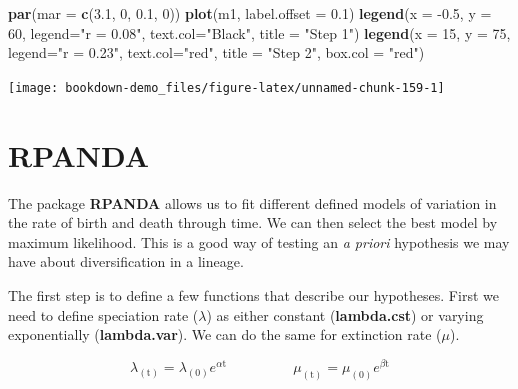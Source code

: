 \documentclass[
]{book}
\newenvironment{Shaded}{\begin{snugshade}}{\end{snugshade}}
\newcommand{\DataTypeTok}[1]{\textcolor[rgb]{0.13,0.29,0.53}{#1}}
\newcommand{\DecValTok}[1]{\textcolor[rgb]{0.00,0.00,0.81}{#1}}
\newcommand{\FloatTok}[1]{\textcolor[rgb]{0.00,0.00,0.81}{#1}}
\newcommand{\KeywordTok}[1]{\textcolor[rgb]{0.13,0.29,0.53}{\textbf{#1}}}
\newcommand{\NormalTok}[1]{#1}
\newcommand{\StringTok}[1]{\textcolor[rgb]{0.31,0.60,0.02}{#1}}
\begin{document}
\begin{Shaded}
\begin{Highlighting}[]
\KeywordTok{par}\NormalTok{(}\DataTypeTok{mar =} \KeywordTok{c}\NormalTok{(}\FloatTok{3.1}\NormalTok{, }\DecValTok{0}\NormalTok{, }\FloatTok{0.1}\NormalTok{, }\DecValTok{0}\NormalTok{))}
\KeywordTok{plot}\NormalTok{(m1, }\DataTypeTok{label.offset =} \FloatTok{0.1}\NormalTok{)}
\KeywordTok{legend}\NormalTok{(}\DataTypeTok{x =} \FloatTok{{-}0.5}\NormalTok{, }\DataTypeTok{y =} \DecValTok{60}\NormalTok{, }\DataTypeTok{legend=}\StringTok{"r = 0.08"}\NormalTok{,}
       \DataTypeTok{text.col=}\StringTok{"Black"}\NormalTok{, }\DataTypeTok{title =} \StringTok{"Step 1"}\NormalTok{)}
\KeywordTok{legend}\NormalTok{(}\DataTypeTok{x =} \DecValTok{15}\NormalTok{, }\DataTypeTok{y =} \DecValTok{75}\NormalTok{, }\DataTypeTok{legend=}\StringTok{"r = 0.23"}\NormalTok{,}
       \DataTypeTok{text.col=}\StringTok{"red"}\NormalTok{, }\DataTypeTok{title =} \StringTok{"Step 2"}\NormalTok{, }\DataTypeTok{box.col =} \StringTok{"red"}\NormalTok{)}
\end{Highlighting}
\end{Shaded}

\begin{center}\texttt{[image: bookdown-demo\_files/figure-latex/unnamed-chunk-159-1]} \end{center}

\hypertarget{rpanda}{%
\section{RPANDA}\label{rpanda}}

The package \textbf{RPANDA} \citep{rpanda} allows us to fit different defined models of variation in the rate of birth and death through time. We can then select the best model by maximum likelihood. This is a good way of testing an \emph{a priori} hypothesis we may have about diversification in a lineage.

The first step is to define a few functions that describe our hypotheses. First we need to define speciation rate (\(\lambda\)) as either constant (\textbf{lambda.cst}) or varying exponentially (\textbf{lambda.var}). We can do the same for extinction rate (\(\mu\)).

\[ \lambda_{(\text{t})} = \lambda_{(0)}e^{\alpha \text{t}} \;\;\;\;\;\;\;\;\;\;\;\;\;\;\;\;\;  \mu_{(\text{t})} = \mu_{(0)}e^{\beta \text{t}} \]
\end{document}
